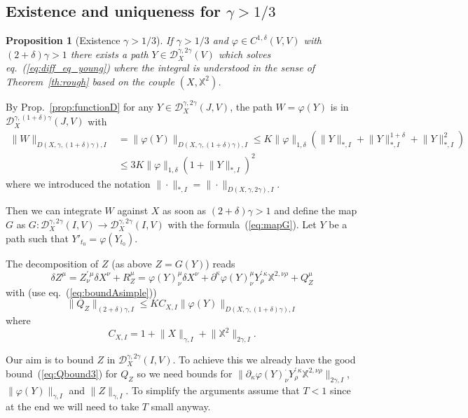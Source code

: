 \documentclass[a4paper,12pt,reqno]{amsproc}
\newcommand{\der}{\delta\!}
\newcommand{\XX}{\mathbb{X}}
\newcommand{\DD}{\mathcal{D}}
\newcommand{\norm}[1]{\lVert #1\rVert}
\newtheorem{proposition}{Proposition}
\begin{document}
\subsection{Existence and uniqueness for $\gamma > 1/3$}

\begin{proposition}[Existence $\gamma > 1/3$]
\label{eq:existence_rough} 
If $\gamma > 1/3$ and $\varphi \in C^{1,\delta}(V,V)$ with $(2+\delta)\gamma>1$
there exists a path $Y \in
\DD^{\gamma,2\gamma}_X(V)$ which solves eq.~(\ref{eq:diff_eq_young})
where the integral is understood in the sense of
Theorem~\ref{th:rough} based on the couple $(X,\mathbb{X}^2)$.    
\end{proposition}
\proof
By Prop.~\ref{prop:functionD} for any  $Y \in \DD_{X}^{\gamma,2\gamma}(J,V)$,  
 the path $W = \varphi(Y)$ is in
 $\DD_{X}^{\gamma,(1+\delta)\gamma}(J,V)$ with
\begin{equation}
\label{eq:boundWxx}
\begin{split}
\norm{W}_{D(X,\gamma,(1+\delta)\gamma),I} & =  \norm{\varphi(Y)}_{D(X,\gamma,(1+\delta)\gamma),I} \le  
K \|\varphi\|_{1,\delta}(
\norm{Y}_{*,I} + \norm{Y}^{1+\delta}_{*,I} + \norm{Y}^{2}_{*,I})
\\ & 
\le 3 K \|\varphi\|_{1,\delta} (1+\norm{Y}_{*,I})^2  
\end{split}
\end{equation}
where we introduced the notation  $\|\cdot\|_{*,I} = \|\cdot \|_{D(X,\gamma,2\gamma),I}$.

Then we can integrate $W$
 against $X$ as soon as $(2+\delta)\gamma > 1$ and  define the map
 $G$  as   $G :
\DD^{\gamma,2\gamma}_X(I,V) \to
\DD^{\gamma,2\gamma}_X(I,V)$ with the formula~(\ref{eq:mapG}). Let $Y$
 be a path such that $Y'_{t_0} = \varphi(Y_{t_0})$.

The decomposition of $Z$ (as above  $Z = G(Y)$) reads
\begin{equation*}
\der Z^\mu = Z^{\prime\,\mu}_\nu \der X^\nu + R_Z^\mu = \varphi(Y)^{\mu}_{\nu} \der X^\nu + 
\partial^\kappa \varphi(Y)^{\mu}_{\nu} Y^{\prime\,\kappa}_{\rho} \XX^{2,\nu\rho} + Q^\mu_Z
\end{equation*}
with (use eq.~(\ref{eq:boundAsimple}))
\begin{equation}
\label{eq:Qbound3}
\norm{Q_Z}_{(2+\delta)\gamma,I} \le K C_{X,I}
\norm{\varphi(Y)}_{D(X,\gamma,(1+\delta)\gamma),I} 
\end{equation}
where
$$
C_{X,I} = 1+\norm{X}_{\gamma,I}+\norm{\mathbb{X}^2}_{2\gamma,I}.
$$

Our aim is to bound $Z$ in $\DD_X^{\gamma,2\gamma}(I,V)$. To achieve
this we already have the good bound~(\ref{eq:Qbound3}) for $Q_Z$ so we
need  bounds  for $\norm{\partial_\kappa \varphi(Y)^{\cdot}_{\nu}
 Y^{\prime\,\kappa}_{\rho} \XX^{2,\nu\rho}}_{2\gamma,I}$,
$\norm{\varphi(Y)}_{\gamma,I}$ and $\norm{Z}_{\gamma,I}$. 
To simplify the arguments assume that
$T < 1$ since at the end we will need to take $T$ small anyway.
\end{document}
